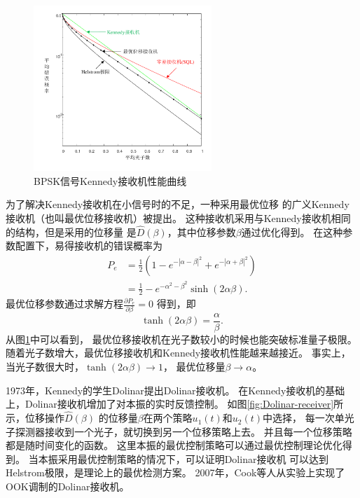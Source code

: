 \begin{figure}
\centering
  \includegraphics[width=0.6\textwidth]{figures/chap2/Kennedy-error}
  \caption{BPSK信号Kennedy接收机性能曲线}
  \label{fig:Kennedy-error}
\end{figure}


为了解决Kennedy接收机在小信号时的不足，一种采用最优位移
的广义Kennedy接收机（也叫最优位移接收机）被提出\cite{takeoka2008discrimination}。
这种接收机采用与Kennedy接收机相同的结构，但是采用的位移量
是$\hat{D}(\beta)$，其中位移参数$\beta$通过优化得到。
在这种参数配置下，易得接收机的错误概率为
\begin{equation}
\begin{split}
P_e &= \frac{1}{2} (1 - e^{-|\alpha-\beta|^2} + e^{-|\alpha+\beta|^2}) \\
    &= \frac{1}{2} - e^{-\alpha^2-\beta^2} \sinh(2\alpha\beta).
\label{eq:BPSK-Opt-Kennedy}
\end{split}
\end{equation}
最优位移参数通过求解方程$\frac{\partial P_e}{\partial \beta} = 0$
得到，即
\begin{equation}
\tanh(2\alpha\beta) = \frac{\alpha}{\beta}.
\end{equation}
从图\ref{fig:Kennedy-error}中可以看到，
最优位移接收机在光子数较小的时候也能突破标准量子极限。
随着光子数增大，最优位移接收机和Kennedy接收机性能越来越接近。
事实上，当光子数很大时，$\tanh(2\alpha\beta) \rightarrow 1$，
最优位移量$\beta \rightarrow  \alpha$。


1973年，Kennedy的学生Dolinar提出Dolinar接收机。
在Kennedy接收机的基础上，Dolinar接收机增加了对本振的实时反馈控制\cite{dolinar1973optimum}。
如图\ref{fig:Dolinar-receiver}所示，位移操作$\hat{D}(\beta)$
的位移量$\beta$在两个策略$u_1(t)$和$u_2(t)$中选择，
每一次单光子探测器接收到一个光子，就切换到另一个位移策略上去。
并且每一个位移策略都是随时间变化的函数。
这里本振的最优控制策略可以通过最优控制理论优化得到\cite{geremia2004distinguishing}。
当本振采用最优控制策略的情况下，可以证明Dolinar接收机
可以达到Helstrom极限，是理论上的最优检测方案\cite{dolinar1973optimum,geremia2004distinguishing}。
2007年，Cook等人从实验上实现了OOK调制的Dolinar接收机\cite{cook2007optical}。

